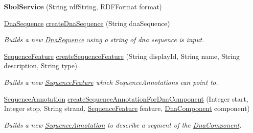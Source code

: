 \begin{DoxyCompactItemize}
\item 
\hypertarget{classorg_1_1sbolstandard_1_1lib_s_b_o_lj_1_1_sbol_service_a0a1f866468d00d778525ac0b65246934}{
{\bfseries SbolService} (String rdfString, RDFFormat format)}
\label{classorg_1_1sbolstandard_1_1lib_s_b_o_lj_1_1_sbol_service_a0a1f866468d00d778525ac0b65246934}

\item 
\hyperlink{classorg_1_1sbolstandard_1_1lib_s_b_o_lj_1_1_dna_sequence}{DnaSequence} \hyperlink{classorg_1_1sbolstandard_1_1lib_s_b_o_lj_1_1_sbol_service_a61e2cda6134ecedb3a5d0b92206b91a2}{createDnaSequence} (String dnaSequence)
\begin{DoxyCompactList}\small\item\em Builds a new \hyperlink{classorg_1_1sbolstandard_1_1lib_s_b_o_lj_1_1_dna_sequence}{DnaSequence} using a string of dna sequence is input. \item\end{DoxyCompactList}\item 
\hyperlink{classorg_1_1sbolstandard_1_1lib_s_b_o_lj_1_1_sequence_feature}{SequenceFeature} \hyperlink{classorg_1_1sbolstandard_1_1lib_s_b_o_lj_1_1_sbol_service_a5dab616a55f915c1ebaa6b244fb48fb5}{createSequenceFeature} (String displayId, String name, String description, String type)
\begin{DoxyCompactList}\small\item\em Builds a new \hyperlink{classorg_1_1sbolstandard_1_1lib_s_b_o_lj_1_1_sequence_feature}{SequenceFeature} which SequenceAnnotations can point to. \item\end{DoxyCompactList}\item 
\hyperlink{classorg_1_1sbolstandard_1_1lib_s_b_o_lj_1_1_sequence_annotation}{SequenceAnnotation} \hyperlink{classorg_1_1sbolstandard_1_1lib_s_b_o_lj_1_1_sbol_service_a356289e398e1fe3a192b8c1ef74e0a4c}{createSequenceAnnotationForDnaComponent} (Integer start, Integer stop, String strand, \hyperlink{classorg_1_1sbolstandard_1_1lib_s_b_o_lj_1_1_sequence_feature}{SequenceFeature} feature, \hyperlink{classorg_1_1sbolstandard_1_1lib_s_b_o_lj_1_1_dna_component}{DnaComponent} component)
\begin{DoxyCompactList}\small\item\em Builds a new \hyperlink{classorg_1_1sbolstandard_1_1lib_s_b_o_lj_1_1_sequence_annotation}{SequenceAnnotation} to describe a segment of the \hyperlink{classorg_1_1sbolstandard_1_1lib_s_b_o_lj_1_1_dna_component}{DnaComponent}. \item\end{DoxyCompactList}\item 

\end{DoxyCompactItemize}
